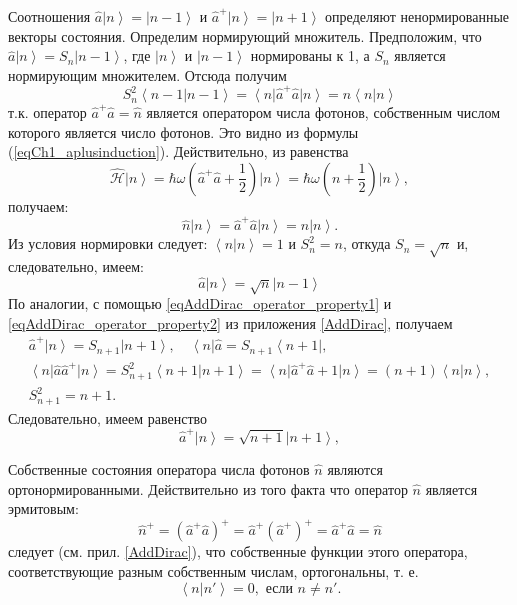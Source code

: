 Соотношения 
$\hat{a} \left|n\right> = \left|n - 1\right>$
и
$\hat{a}^{+} \left|n\right> = \left|n + 1\right>$
определяют ненормированные векторы состояния. Определим нормирующий
множитель. Предположим, что  
$\hat{a} \left|n\right> = S_n \left|n - 1\right>$,  где 
$\left|n\right>$ и $\left|n - 1\right>$ нормированы к  1,  а $S_n$
является нормирующим множителем. Отсюда получим 
\[
S_n^2\left<n - 1\right.\left|n - 1\right> =
\left<n\right|\hat{a}^{+}\hat{a}\left|n\right> = 
n  \left<n\right.\left|n\right>
\]
т.к. оператор    
$\hat{a}^{+}\hat{a} = \hat{n}$
является оператором числа фотонов, собственным числом
которого является число фотонов. Это видно из формулы
(\ref{eqCh1_aplusinduction}). Действительно, из равенства
\[
\hat{\mathcal{H}} \left|n\right> =
\hbar \omega \left(
\hat{a}^{+}\hat{a} + \frac{1}{2}
\right)
\left|n\right> = 
\hbar \omega \left(n + \frac{1}{2}\right)
\left|n\right>,
\]
получаем:
\[
\hat{n}\left|n\right> = \hat{a}^{+}\hat{a} \left|n\right> = n
\left|n\right>. 
\]
Из условия нормировки следует: $\left<n\right.\left|n\right> = 1$   и
$S_n^2 = n$,  откуда $S_n = \sqrt{n}$ и, следовательно, имеем: 
\begin{equation}
\hat{a}\left|n\right> = \sqrt{n}\left|n - 1\right>
\end{equation}
По аналогии, с помощью \ref{eqAddDirac_operator_property1} и
  \ref{eqAddDirac_operator_property2} из приложения \ref{AddDirac},
  получаем 
\begin{eqnarray}
\hat{a}^{+}\left|n\right> = S_{n+1}\left|n + 1\right>,
\quad 
\left<n\right|\hat{a} = S_{n + 1}\left<n + 1\right|,
\nonumber \\
\left<n\right|\hat{a}\hat{a}^{+}\left|n\right> = S_{n+1}^2
\left<n + 1\right|\left.n + 1\right> = 
\left<n\right|\hat{a}^{+}\hat{a} + 1\left|n\right> = 
\left(n + 1\right)\left<n\right.\left|n\right>,
\nonumber \\
S_{n+1}^2 = n + 1.
\end{eqnarray}
Следовательно, имеем равенство
\begin{equation}
\hat{a}^{+}\left|n\right> = \sqrt{n + 1}\left|n + 1\right>,
\end{equation}

Собственные состояния оператора числа фотонов $\hat{n}$ являются ортонормированными. 
Действительно из того факта что оператор $\hat{n}$ является эрмитовым:
\[
\hat{n}^{+} = \left(\hat{a}^{+}\hat{a}\right)^{+} = 
\hat{a}^{+} \left(\hat{a}^{+}\right)^{+} = 
\hat{a}^{+}\hat{a} = \hat{n}
\]
следует (см. прил. \ref{AddDirac}), что собственные функции этого оператора,
соответствующие разным собственным числам, ортогональны, т. е.
\begin{equation}
\left<n\right|\left.n'\right> = 0, \mbox{ если } n \ne n'.
\label{eqOrtoN}
\end{equation}

